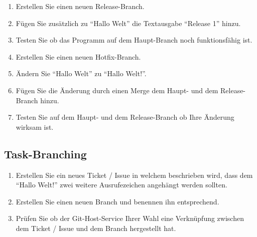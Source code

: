 \begin{enumerate}
    \item Erstellen Sie einen neuen Release\hyp Branch.

    \item Fügen Sie zusätzlich zu \enquote{Hallo Welt} die Textausgabe \enquote{Release 1} hinzu.
    
    \item Testen Sie ob das Programm auf dem Haupt\hyp Branch noch funktionsfähig ist.
    
    \item Erstellen Sie einen neuen Hotfix\hyp Branch.
    
    \item Ändern Sie \enquote{Hallo Welt} zu \enquote{Hallo Welt!}.

    \item Fügen Sie die Änderung durch einen Merge dem Haupt- und dem Release\hyp Branch hinzu.
    
    \item Testen Sie auf dem Haupt- und dem Release\hyp Branch ob Ihre Änderung wirksam ist.
\end{enumerate}

\subsection{Task\hyp Branching}

\begin{enumerate}
    \item Erstellen Sie ein neues Ticket / Issue in welchem beschrieben wird, dass dem \enquote{Hallo Welt!} zwei weitere Ausrufezeichen angehängt werden sollten.

    \item Erstellen Sie einen neuen Branch und benennen ihn entsprechend.
    
    \item Prüfen Sie ob der Git\hyp Host\hyp Service Ihrer Wahl eine Verknüpfung zwischen dem Ticket / Issue und dem Branch hergestellt hat.
\end{enumerate}
